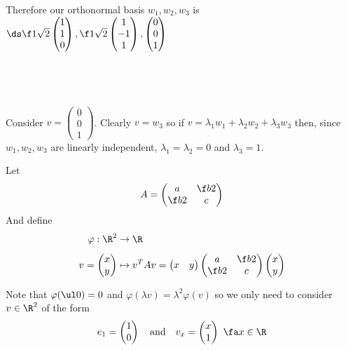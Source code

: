 \documentclass[a4paper]{article}
\begin{document}
Therefore our orthonormal basis $w_1, w_2, w_3$ is $\ds \f1{\sqrt2} \begin{pmatrix}1\\ 1\\ 0\end{pmatrix}, \f1{\sqrt2} \begin{pmatrix}1\\ -1\\ 1\end{pmatrix}, \begin{pmatrix}0\\ 0\\ 1\end{pmatrix}$

\subsection{~}

Consider $v = \begin{pmatrix}0\\ 0\\ 1\end{pmatrix}$. Clearly $v = w_3$ so if $v = \lambda_1 w_1 + \lambda_2 w_2 + \lambda_3 w_3$ then, since $w_1, w_2, w_3$ are linearly independent, $\lambda_1 = \lambda_2 = 0$ and $\lambda_3 = 1$.



Let $$A = \begin{pmatrix} a & \f b2 \\ \f b2 & c \end{pmatrix}$$
And define \begin{align*}
\varphi : \R^2 &\to \R\\[1ex]
v = \begin{pmatrix} x \\ y \end{pmatrix} &\mapsto v^T A v = \begin{pmatrix} x & y \end{pmatrix} \begin{pmatrix} a & \f b2 \\ \f b2 & c \end{pmatrix} \begin{pmatrix} x \\ y \end{pmatrix}
\end{align*}

Note that $\varphi(\ul 0) = 0$ and $\varphi(\lambda v) = \lambda^2 \varphi(v)$ so we only need to consider $v \in \R^2$ of the form $$e_1 = \begin{pmatrix} 1 \\ 0 \end{pmatrix} \quad\text{and}\quad v_x = \begin{pmatrix} x \\ 1 \end{pmatrix}\ \fa x \in \R$$
\end{document}
